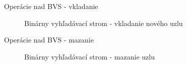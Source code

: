 \documentclass[10pt]{beamer}
\begin{document}
\begin{frame}{Operácie nad BVS - vkladanie}
    \begin{center}
    \begin{figure}
        \caption{Binárny vyhľadávací strom - vkladanie nového uzlu}
    \end{figure}
    \end{center}
\end{frame}

\begin{frame}{Operácie nad BVS - mazanie}
    \begin{center}
    \begin{figure}
        \caption{Binárny vyhľadávací strom - mazanie uzlu}
    \end{figure}
    \end{center}
\end{frame}

\end{document}
